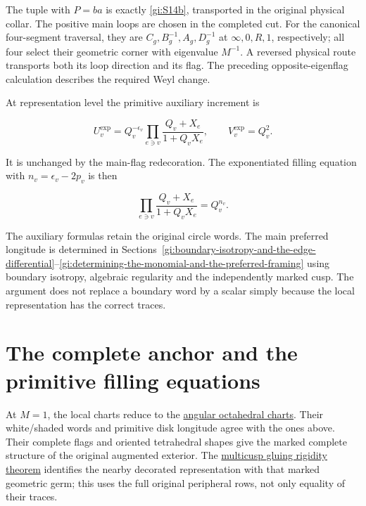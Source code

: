 The tuple with \(P=ba\) is exactly \eqref{gi:S14b}, transported in the
original physical collar. The positive main loops are chosen
in the completed cut. For the canonical four-segment traversal,
they are \(C_g,B_g^{-1},A_g,D_g^{-1}\) at
\(\infty,0,R,1\), respectively; all four select their geometric
corner with eigenvalue \(M^{-1}\). A reversed physical route
transports both its loop direction and its flag. The preceding
opposite-eigenflag calculation describes the required Weyl change.

At representation level the primitive auxiliary increment is

\begin{equation}\label{gi:S16}
U_v^{\exp}
       =Q_v^{-\epsilon_v}
          \prod_{e\ni v}\frac{Q_v+X_e}{1+Q_vX_e},\qquad
 V_v^{\exp}=Q_v^2.
\end{equation}

It is unchanged by the main-flag redecoration. The exponentiated filling
equation with \(n_v=\epsilon_v-2p_v\) is then

\begin{equation}\label{gi:S17}
\prod_{e\ni v}\frac{Q_v+X_e}{1+Q_vX_e}
                                =Q_v^{n_v}.
\end{equation}

The auxiliary formulas retain the original circle words. The main
preferred longitude is determined in Sections~\ref{gi:boundary-isotropy-and-the-edge-differential}--\ref{gi:determining-the-monomial-and-the-preferred-framing} using boundary
isotropy, algebraic regularity and the independently marked cusp.
The argument does not replace a boundary word by a scalar simply
because the local representation has the correct traces.

\section{The complete anchor and the primitive filling equations}\label{gi:the-complete-anchor-and-the-primitive-filling-equations}

At \(M=1\), the local charts reduce to the
\href{https://sashakolpakov.github.io/murakamis_dream/notes/actual_all_circle_angular_octahedra.html}{angular octahedral charts}.
Their white/shaded words and primitive disk longitude agree with the
ones above. Their complete flags and oriented tetrahedral shapes
give the marked complete structure of the original augmented
exterior. The
\href{https://sashakolpakov.github.io/murakamis_dream/notes/general_marked_multicusp_gluing_rigidity.html}{multicusp gluing rigidity theorem}
identifies the nearby decorated representation with that marked
geometric germ; this uses the full original peripheral rows, not
only equality of their traces.

